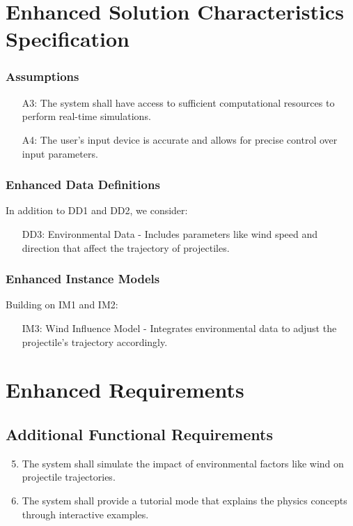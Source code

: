 \documentclass[12pt]{article}
\begin{document}
\section{Enhanced Solution Characteristics Specification}
\subsubsection{Assumptions}
\begin{itemize}
    \item[A3:] The system shall have access to sufficient computational resources to perform real-time simulations.
    \item[A4:] The user's input device is accurate and allows for precise control over input parameters.
\end{itemize}

\subsubsection{Enhanced Data Definitions}
In addition to DD1 and DD2, we consider:
\begin{itemize}
    \item[DD3:] Environmental Data - Includes parameters like wind speed and direction that affect the trajectory of projectiles.
\end{itemize}

\subsubsection{Enhanced Instance Models}
Building on IM1 and IM2:
\begin{itemize}
    \item[IM3:] Wind Influence Model - Integrates environmental data to adjust the projectile's trajectory accordingly.
\end{itemize}

\section{Enhanced Requirements}
\subsection{Additional Functional Requirements}
\begin{enumerate}
    \setcounter{enumi}{4}
    \item The system shall simulate the impact of environmental factors like wind on projectile trajectories.
    \item The system shall provide a tutorial mode that explains the physics concepts through interactive examples.
\end{enumerate}
\end{document}
